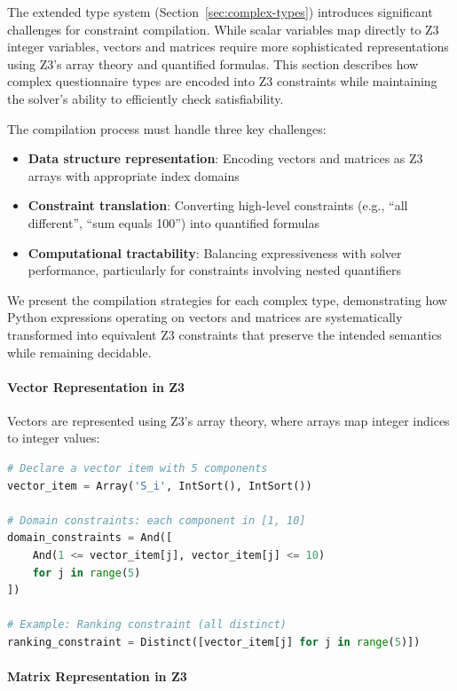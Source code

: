 The extended type system (Section~\ref{sec:complex-types}) introduces significant challenges for constraint compilation. While scalar variables map directly to Z3 integer variables, vectors and matrices require more sophisticated representations using Z3's array theory and quantified formulas. This section describes how complex questionnaire types are encoded into Z3 constraints while maintaining the solver's ability to efficiently check satisfiability.

The compilation process must handle three key challenges:
\begin{itemize}
    \item \textbf{Data structure representation}: Encoding vectors and matrices as Z3 arrays with appropriate index domains
    \item \textbf{Constraint translation}: Converting high-level constraints (e.g., ``all different'', ``sum equals 100'') into quantified formulas
    \item \textbf{Computational tractability}: Balancing expressiveness with solver performance, particularly for constraints involving nested quantifiers
\end{itemize}

We present the compilation strategies for each complex type, demonstrating how Python expressions operating on vectors and matrices are systematically transformed into equivalent Z3 constraints that preserve the intended semantics while remaining decidable.

\paragraph{Vector Representation in Z3}

Vectors are represented using Z3's array theory, where arrays map integer indices to integer values:

\begin{lstlisting}[language=Python, caption={Vector item representation in Z3}]
# Declare a vector item with 5 components
vector_item = Array('S_i', IntSort(), IntSort())

# Domain constraints: each component in [1, 10]
domain_constraints = And([
    And(1 <= vector_item[j], vector_item[j] <= 10)
    for j in range(5)
])

# Example: Ranking constraint (all distinct)
ranking_constraint = Distinct([vector_item[j] for j in range(5)])
\end{lstlisting}

\paragraph{Matrix Representation in Z3}


